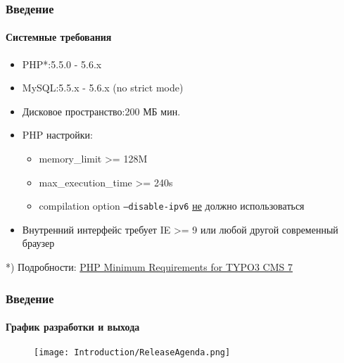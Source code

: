 \begin{frame}[fragile]
	\frametitle{Введение}
	\framesubtitle{Системные требования}

	\begin{itemize}
		\item PHP*:\tabto{4cm}5.5.0 - 5.6.x
		\item MySQL:\tabto{4cm}5.5.x - 5.6.x (no strict mode)
		\item Дисковое пространство:\tabto{4cm}200 МБ мин.
		\item PHP настройки:

			\begin{itemize}
				\item memory\_limit >= 128M
				\item max\_execution\_time >= 240s
				\item compilation option \texttt{--disable-ipv6} \underline{не} должно использоваться
			\end{itemize}

		\item Внутренний интерфейс требует IE >= 9 или любой другой современный браузер

	\end{itemize}

	\vspace{1cm}
	*) Подробности: \href{http://typo3.org/news/article/php-minimum-requirements-for-typo3-cms-7/}{PHP Minimum Requirements for TYPO3 CMS 7}

\end{frame}

\begin{frame}[fragile]
	\frametitle{Введение}
	\framesubtitle{График разработки и выхода}

	\begin{figure}
		\texttt{[image: Introduction/ReleaseAgenda.png]}
	\end{figure}

\end{frame}

